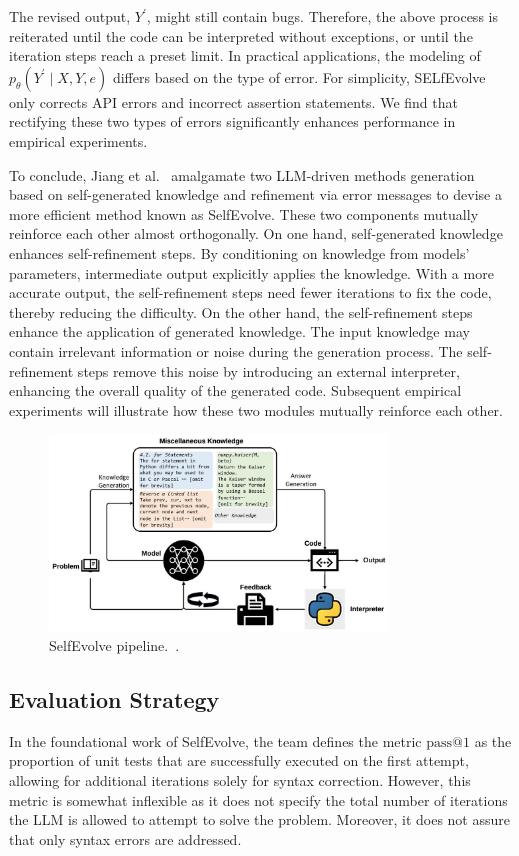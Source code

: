 \documentclass[a4paper,oneside]{book}
\begin{document}
The revised output, $Y^{\prime}$, might still contain bugs. Therefore, the above process is reiterated until the code can be interpreted without exceptions, or until the iteration steps reach a preset limit. In practical applications, the modeling of $p_{\theta}\left(Y^{\prime} \mid X, Y, e\right)$ differs based on the type of error. For simplicity, SELfEvolve only corrects API errors and incorrect assertion statements. We find that rectifying these two types of errors significantly enhances performance in empirical experiments.

To conclude, Jiang et al.~\cite{jiang2023selfevolve} amalgamate two LLM-driven methods \- generation based on self-generated knowledge and refinement via error messages \- to devise a more efficient method known as SelfEvolve. These two components mutually reinforce each other almost orthogonally. On one hand, self-generated knowledge enhances self-refinement steps. By conditioning on knowledge from models' parameters, intermediate output explicitly applies the knowledge. With a more accurate output, the self-refinement steps need fewer iterations to fix the code, thereby reducing the difficulty. On the other hand, the self-refinement steps enhance the application of generated knowledge. The input knowledge may contain irrelevant information or noise during the generation process. The self-refinement steps remove this noise by introducing an external interpreter, enhancing the overall quality of the generated code. Subsequent empirical experiments will illustrate how these two modules mutually reinforce each other.

\begin{figure}[!htb]
    \centering
    \includegraphics[width=0.8\textwidth]{img/selfevolve}
    \caption{SelfEvolve pipeline.~\cite{jiang2023selfevolve}.}\label{fig:selfevolve}
\end{figure}

\subsection{Evaluation Strategy}
In the foundational work of SelfEvolve, the team defines the metric $\text{pass@1}$ as the proportion of unit tests that are successfully executed on the first attempt, allowing for additional iterations solely for syntax correction. However, this metric is somewhat inflexible as it does not specify the total number of iterations the LLM is allowed to attempt to solve the problem. Moreover, it does not assure that only syntax errors are addressed.
\end{document}
